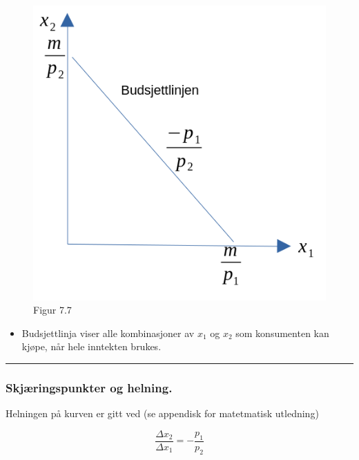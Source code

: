 \documentclass[
  letterpaper,
  DIV=11,
  numbers=noendperiod]{scrartcl}
\providecommand{\tightlist}{%
  \setlength{\itemsep}{0pt}\setlength{\parskip}{0pt}}\usepackage{longtable,booktabs,array}
\begin{document}
\begin{figure}[H]

{\centering \includegraphics[width=1\textwidth,height=\textheight]{drawio/budsjbet.png}

}

\caption{Figur 7.7}

\end{figure}%

\begin{itemize}
\tightlist
\item
  Budsjettlinja viser alle kombinasjoner av \(x_1\) og \(x_2\) som
  konsumenten kan kjøpe, når hele inntekten brukes.
\end{itemize}

\begin{center}\rule{0.5\linewidth}{0.5pt}\end{center}

\subsubsection{Skjæringspunkter og
helning.}\label{skjuxe6ringspunkter-og-helning.}

Helningen på kurven er gitt ved (se appendisk for matetmatisk utledning)

\begin{equation}
\frac{\Delta x_{2}}{\Delta x_{1}}= - \frac{p_{1}}{p_{2}}
\end{equation}
\end{document}
